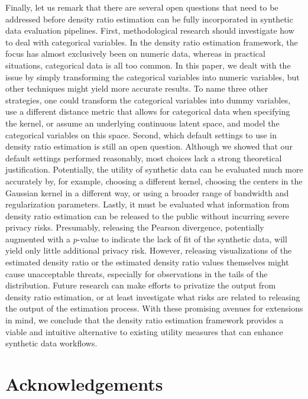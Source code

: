 \documentclass[
]{template/style/uneceart}
\begin{document}
Finally, let us remark that there are several open questions that need
to be addressed before density ratio estimation can be fully
incorporated in synthetic data evaluation pipelines. First,
methodological research should investigate how to deal with categorical
variables. In the density ratio estimation framework, the focus has
almost exclusively been on numeric data, whereas in practical
situations, categorical data is all too common. In this paper, we dealt
with the issue by simply transforming the categorical variables into
numeric variables, but other techniques might yield more accurate
results. To name three other strategies, one could transform the
categorical variables into dummy variables, use a different distance
metric that allows for categorical data when specifying the kernel, or
assume an underlying continuous latent space, and model the categorical
variables on this space. Second, which default settings to use in
density ratio estimation is still an open question. Although we showed
that our default settings performed reasonably, most choices lack a
strong theoretical justification. Potentially, the utility of synthetic
data can be evaluated much more accurately by, for example, choosing a
different kernel, choosing the centers in the Gaussian kernel in a
different way, or using a broader range of bandwidth and regularization
parameters. Lastly, it must be evaluated what information from density
ratio estimation can be released to the public without incurring severe
privacy risks. Presumably, releasing the Pearson divergence, potentially
augmented with a \(p\)-value to indicate the lack of fit of the
synthetic data, will yield only little additional privacy risk. However,
releasing visualizations of the estimated density ratio or the estimated
density ratio values themselves might cause unacceptable threats,
especially for observations in the tails of the distribution. Future
research can make efforts to privatize the output from density ratio
estimation, or at least investigate what risks are related to releasing
the output of the estimation process. With these promising avenues for
extensions in mind, we conclude that the density ratio estimation
framework provides a viable and intuitive alternative to existing
utility measures that can enhance synthetic data workflows.

\hypertarget{acknowledgements}{%
\section{Acknowledgements}\label{acknowledgements}}
\end{document}
